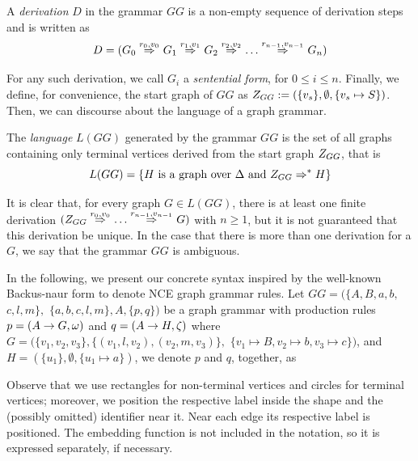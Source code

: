 \begin{definition}
	A \emph{derivation} $D$ in the grammar $GG$ is a non-empty sequence of derivation steps and is written as
	\begin{equation*}
		D = (G_0 \deriv{r_0}{v_0}{} G_1 \deriv{r_1}{v_1}{} G_2 \deriv{r_2}{v_2}{} \dots \deriv{r_{n-1}}{v_{n-1}}{} G_n)
	\end{equation*}
\end{definition}

For any such derivation, we call $G_i$ a \emph{sentential form}, for $0 \le i \le n$. Finally, we define, for convenience, the start graph of $GG$ as $Z_{GG} := (\{v_s\},\emptyset,\{v_s \mapsto S\})$. Then, we can discourse about the language of a graph grammar.

\begin{definition}
	The \emph{language} $L(GG)$ generated by the grammar $GG$ is the set of all graphs containing only terminal vertices derived from the start graph $Z_{GG}$, that is
	\begin{equation*}
		L(GG) = \{H \text{ is a graph over } \Delta \text{ and } Z_{GG} \Rightarrow^*_{} H\}
	\end{equation*}
\end{definition}

It is clear that, for every graph $G \in L(GG)$, there is at least one finite derivation $(\startG{GG} \deriv{r_0}{v_0}{} \dots \deriv{r_{n-1}}{v_{n-1}}{} G)$ with $n \ge 1$, but it is not guaranteed that this derivation be unique. In the case that there is more than one derivation for a $G$, we say that the grammar $GG$ is ambiguous.

In the following, we present our concrete syntax inspired by the well-known Backus-naur form to denote NCE graph grammar rules. Let $GG = (\{A, B, a, b,$ $ c, l, m\},$ $\{a, b, c, l, m\}, A, \{p,q\})$ be a graph grammar with production rules $p = (A \to G,\omega)$ and $q = (A \to H,\zeta)$ where $G = (\{v_1, v_2, v_3\}, \{(v_1,l,v_2), (v_2,m,v_3)\},$ $\{v_1 \mapsto B, v_2 \mapsto b, v_3 \mapsto c \})$, and $H = (\{u_1\}, \emptyset, \{u_1 \mapsto a\})$, we denote $p$ and $q$, together, as
	


Observe that we use rectangles for non-terminal vertices and circles for terminal vertices; moreover, we position the respective label inside the shape and the (possibly omitted) identifier near it. Near each edge its respective label is positioned. The embedding function is not included in the notation, so it is expressed separately, if necessary.

